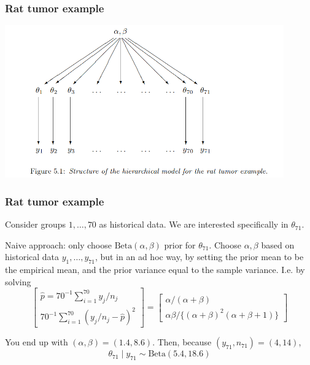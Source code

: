 \documentclass{beamer}
\begin{document}
\begin{frame}
\frametitle{Rat tumor example}

\begin{center}
\includegraphics[width=120mm]{hierarchical_structure.png}
\end{center}

\end{frame}



\begin{frame}
\frametitle{Rat tumor example}

Consider groups $1, \ldots, 70$ as historical data. We are interested specifically in $\theta_{71}$.
\newline

Naive approach: only choose $\text{Beta}(\alpha,\beta)$ prior for $\theta_{71}$. Choose $\alpha,\beta$ based on historical data $y_1, \ldots, y_{71}$, but in an ad hoc way, by setting the prior mean to be the empirical mean, and the prior variance equal to the sample variance. I.e. by solving
\[
\left[\begin{array}{c}
\hat{p} = 70^{-1}\sum_{i=1}^{70} y_j/n_j \\
70^{-1}\sum_{i=1}^{70} (y_j/n_j - \hat{p})^2
\end{array}\right]
=
\left[\begin{array}{c}
\alpha/(\alpha+\beta) \\
\alpha \beta / \{(\alpha+\beta)^2(\alpha + \beta + 1) \}
\end{array}\right]
\]

You end up with $(\alpha,\beta) = (1.4, 8.6)$. Then, because $(y_{71},n_{71}) = (4,14)$,
\[
\theta_{71} \mid y_{71} \sim \text{Beta}(5.4, 18.6)
\]

\end{frame}
\end{document}
